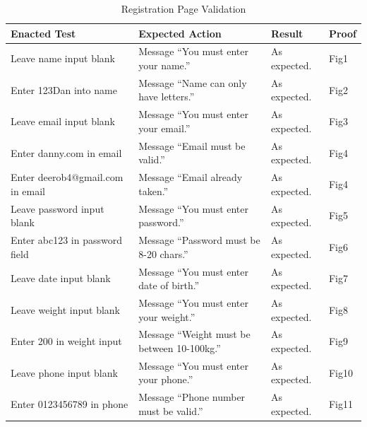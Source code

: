 \documentclass{article}[12pt,a4paper]
\begin{document}
\begin{table}[h]
\begin{tabular}{|l|l|l|l|}
\hline
\textbf{Enacted Test}          & \textbf{Expected Action}                  & \textbf{Result} & \textbf{Proof} \\ \hline
Leave name input blank         & Message ``You must enter your name.''        & As expected.    & Fig1           \\ \hline
Enter 123Dan into name         & Message ``Name can only have letters.''      & As expected.    & Fig2           \\ \hline
Leave email input blank        & Message ``You must enter your email.''       & As expected.    & Fig3           \\ \hline
Enter danny.com in email       & Message ``Email must be valid.''             & As expected.    & Fig4           \\ \hline
Enter deerob4@gmail.com in email & Message ``Email already taken.''             & As expected.    & Fig4           \\ \hline
Leave password input blank     & Message ``You must enter password.''         & As expected.    & Fig5           \\ \hline
Enter abc123 in password field & Message ``Password must be 8-20 chars.''     & As expected.    & Fig6           \\ \hline
Leave date input blank         & Message ``You must enter date of birth.''    & As expected.    & Fig7           \\ \hline
Leave weight input blank       & Message ``You must enter your weight.''      & As expected.    & Fig8           \\ \hline
Enter 200 in weight input      & Message ``Weight must be between 10-100kg.'' & As expected.    & Fig9           \\ \hline
Leave phone input blank        & Message ``You must enter your phone.''       & As expected.    & Fig10          \\ \hline
Enter 0123456789 in phone      & Message ``Phone number must be valid.''      & As expected.    & Fig11          \\ \hline
\end{tabular}
\caption{Registration Page Validation}
\end{table}
\end{document}
